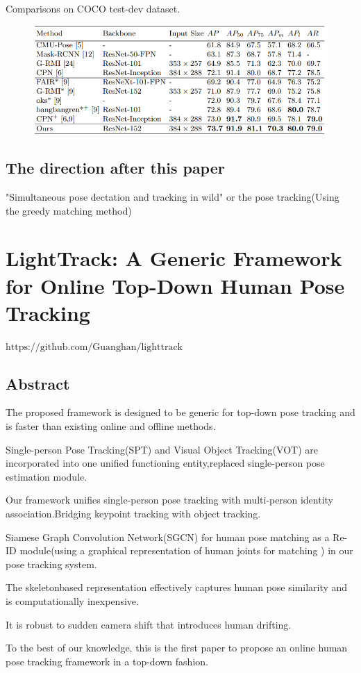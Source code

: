 \documentclass[11pt]{article}
\begin{document}
Comparisons on COCO test-dev dataset.
\begin{figure}[h]
	\centering
	\includegraphics[scale = 0.5]{26}
\end{figure}
\subsection{The direction after this paper}

"Simultaneous pose dectation and tracking in wild" or the pose tracking(Using the greedy matching method) 
\section{LightTrack: A Generic Framework for Online Top-Down Human Pose Tracking}
$\text{https://github.com/Guanghan/lighttrack}$
\subsection{Abstract}
The proposed framework is designed to be generic for top-down pose tracking and is faster than existing online and offline methods.

Single-person Pose Tracking(SPT) and Visual Object Tracking(VOT) are incorporated into one unified functioning entity,replaced single-person pose estimation module.

Our framework unifies single-person pose tracking with multi-person identity association.Bridging keypoint tracking with object tracking.

Siamese Graph Convolution Network(SGCN) for human pose matching as a Re-ID module(using a graphical representation of human joints for matching ) in our pose tracking system.

The skeletonbased representation effectively captures human pose similarity and is computationally inexpensive.

It is robust to sudden camera shift that introduces human drifting.

To the best of our knowledge, this is the first paper to propose an online human pose tracking framework in a top-down fashion.
\end{document}
